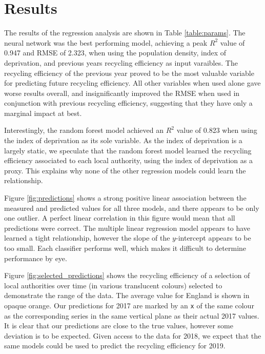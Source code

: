\documentclass[11pt,conference]{IEEEtran}
\begin{document}
\section{Results}

The results of the regression analysis are shown in Table \ref{table:params}. The neural network was the best performing model, achieving a peak $R^2$ value of 0.947 and RMSE of 2.323, when using the population density, index of deprivation, and previous years recycling efficiency as input varaibles. The recycling efficiency of the previous year proved to be the most valuable variable for predicting future recycling efficiency. All other variables when used alone gave worse results overall, and insignificantly improved the RMSE when used in conjunction with previous recycling efficiency, suggesting that they have only a marginal impact at best.  

Interestingly, the random forest model achieved an $R^2$ value of 0.823 when using the index of deprivation as its sole variable. As the index of deprivation is a largely static, we speculate that the random forest model learned the recycling efficiency associated to each local authority, using the index of deprivation as a proxy. This explains why none of the other regression models could learn the relationship.

Figure \ref{fig:predictions} shows a strong positive linear association between the measured and predicted values for all three models, and there appears to be only one outlier. A perfect linear correlation in this figure would mean that all predictions were correct. The multiple linear regression model appears to have learned a tight relationship, however the slope of the $y$-intercept appears to be too small.  Each classifier performs well, which makes it difficult to determine performance by eye. 

Figure \ref{fig:selected_predictions} shows the recycling efficiency of a selection of local authorities over time (in various translucent colours) selected to demonstrate the range of the data. The average value for England is shown in opaque orange. Our predictions for 2017 are marked by an \texttt{x} of the same colour as the corresponding series in the same vertical plane as their actual 2017 values. It is clear that our predictions are close to the true values, however some deviation is to be expected. Given access to the data for 2018, we expect that the same models could be used to predict the recycling efficiency for 2019. 
\end{document}
